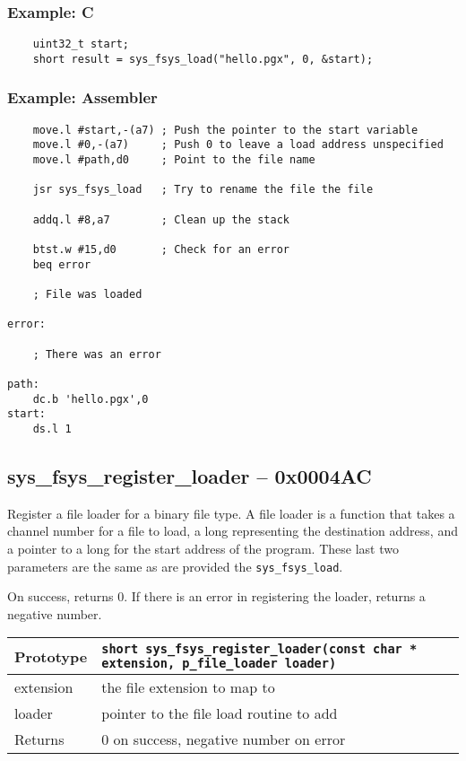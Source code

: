 \subsubsection*{Example: C}
\begin{lstlisting}
    uint32_t start;
    short result = sys_fsys_load("hello.pgx", 0, &start);
\end{lstlisting}

\subsubsection*{Example: Assembler}
\begin{verbatim}
    move.l #start,-(a7) ; Push the pointer to the start variable
    move.l #0,-(a7)     ; Push 0 to leave a load address unspecified
    move.l #path,d0     ; Point to the file name

    jsr sys_fsys_load   ; Try to rename the file the file

    addq.l #8,a7        ; Clean up the stack

    btst.w #15,d0       ; Check for an error
    beq error

    ; File was loaded

error:

    ; There was an error

path:
    dc.b 'hello.pgx',0
start:
    ds.l 1
\end{verbatim}


\subsection*{sys\_fsys\_register\_loader -- 0x0004AC}
Register a file loader for a binary file type.
A file loader is a function that takes a channel number for a file to load, a long representing the destination address,
and a pointer to a long for the start address of the program. These last two parameters are the same as are provided the \verb+sys_fsys_load+.

On success, returns 0. If there is an error in registering the loader, returns a negative number.

\bigskip

\begin{tabular}{|l||l|} \hline
Prototype & \lstinline!short sys_fsys_register_loader(const char * extension, p_file_loader loader)! \\ \hline
extension & the file extension to map to \\ \hline
loader & pointer to the file load routine to add \\ \hline
Returns & 0 on success, negative number on error \\ \hline
\end{tabular}

